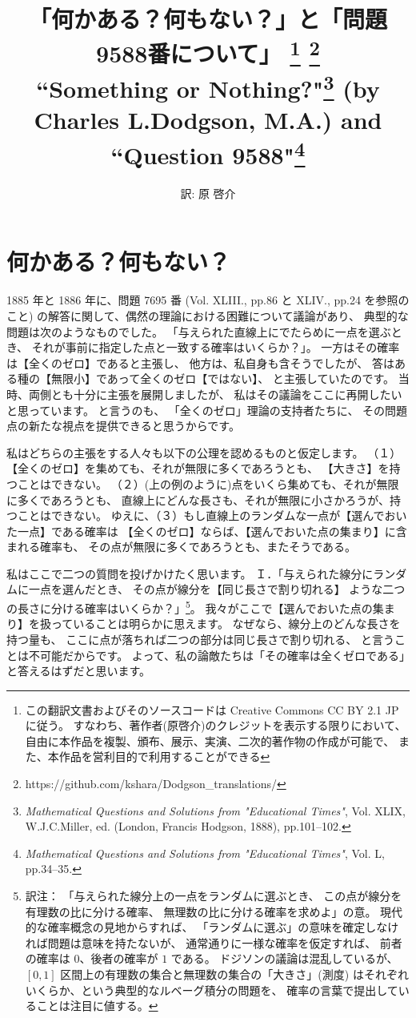 \documentclass{article}
\title{「何かある？何もない？」と「問題9588番について」
    \footnote{この翻訳文書およびそのソースコードは
    Creative Commons CC BY 2.1 JP に従う。
    すなわち、著作者(原啓介)のクレジットを表示する限りにおいて、
    自由に本作品を複製、頒布、展示、実演、二次的著作物の作成が可能で、
    また、本作品を営利目的で利用することができる}
    \footnote{https://github.com/kshara/Dodgson\_translations/}
    \\
    \smallskip
    {\large
        ``Something or Nothing?"\footnote{
            {\it Mathematical Questions and Solutions from "Educational Times"},
            Vol. XLIX,
    W.J.C.Miller, ed. (London, Francis Hodgson, 1888), pp.101--102.}
    (by Charles L.Dodgson, M.A.)
    and ``Question 9588"\footnote{
        {\it Mathematical Questions and Solutions from "Educational Times"},
    Vol. L, pp.34--35.}
    }
}
\author{訳: 原 啓介}
\begin{document}
\maketitle

\section*{何かある？何もない？}

  1885 年と 1886 年に、問題 7695 番
(Vol. XLIII., pp.86 と XLIV., pp.24 を参照のこと)
の解答に関して、偶然の理論における困難について議論があり、
典型的な問題は次のようなものでした。
「与えられた直線上にでたらめに一点を選ぶとき、
それが事前に指定した点と一致する確率はいくらか？」。
一方はその確率は【全くのゼロ】であると主張し、
他方は、私自身も含そうでしたが、
答はある種の【無限小】であって全くのゼロ【ではない】、
と主張していたのです。
当時、両側とも十分に主張を展開しましたが、
私はその議論をここに再開したいと思っています。
と言うのも、
「全くのゼロ」理論の支持者たちに、
その問題点の新たな視点を提供できると思うからです。

 私はどちらの主張をする人々も以下の公理を認めるものと仮定します。
（１）【全くのゼロ】を集めても、それが無限に多くであろうとも、
【大きさ】を持つことはできない。
（２）(上の例のように)点をいくら集めても、それが無限に多くであろうとも、
直線上にどんな長さも、それが無限に小さかろうが、持つことはできない。
ゆえに、（３）もし直線上のランダムな一点が【選んでおいた一点】である確率は
【全くのゼロ】ならば、【選んでおいた点の集まり】に含まれる確率も、
その点が無限に多くであろうとも、またそうである。

 私はここで二つの質問を投げかけたく思います。
Ｉ．「与えられた線分にランダムに一点を選んだとき、
その点が線分を【同じ長さで割り切れる】
ような二つの長さに分ける確率はいくらか？」\footnote{訳注：
「与えられた線分上の一点をランダムに選ぶとき、
この点が線分を有理数の比に分ける確率、
無理数の比に分ける確率を求めよ」の意。
現代的な確率概念の見地からすれば、
「ランダムに選ぶ」の意味を確定しなければ問題は意味を持たないが、
通常通りに一様な確率を仮定すれば、
前者の確率は $0$、後者の確率が $1$ である。
ドジソンの議論は混乱しているが、
$[0, 1]$ 区間上の有理数の集合と無理数の集合の「大きさ」(測度)
はそれぞれいくらか、という典型的なルベーグ積分の問題を、
確率の言葉で提出していることは注目に値する。}。
我々がここで【選んでおいた点の集まり】を扱っていることは明らかに思えます。
なぜなら、線分上のどんな長さを持つ量も、
ここに点が落ちれば二つの部分は同じ長さで割り切れる、
と言うことは不可能だからです。
よって、私の論敵たちは「その確率は全くゼロである」と答えるはずだと思います。
\end{document}
